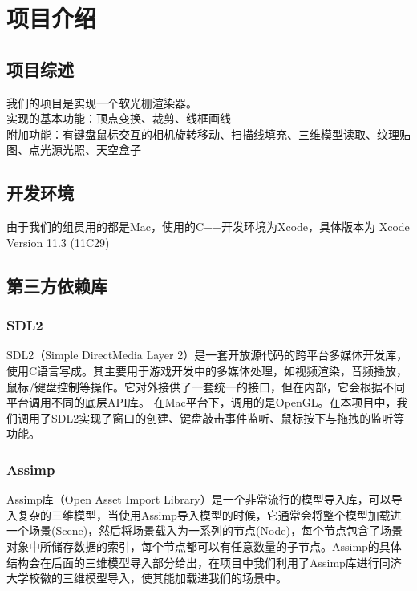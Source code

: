 

    \chapter{项目介绍}

    \section{项目综述}
        \begin{spacing}{2.5}
\noindent 我们的项目是实现一个软光栅渲染器。\\实现的基本功能：顶点变换、裁剪、线框画线\\
	附加功能：有键盘鼠标交互的相机旋转移动、扫描线填充、三维模型读取、纹理贴图、点光源光照、天空盒子     	
        \end{spacing}



    \section{开发环境}
	        \begin{spacing}{2.5}
由于我们的组员用的都是Mac，使用的C++开发环境为Xcode，具体版本为 Xcode Version 11.3 (11C29)
	        \end{spacing}



    \section{第三方依赖库}


    \subsection{SDL2}
\begin{spacing}{2.5}
   SDL2（Simple DirectMedia Layer 2）是一套开放源代码的跨平台多媒体开发库，使用C语言写成。其主要用于游戏开发中的多媒体处理，如视频渲染，音频播放，鼠标/键盘控制等操作。它对外接供了一套统一的接口，但在内部，它会根据不同平台调用不同的底层API库。
   在Mac平台下，调用的是OpenGL。在本项目中，我们调用了SDL2实现了窗口的创建、键盘敲击事件监听、鼠标按下与拖拽的监听等功能。
\end{spacing}



    \subsection{Assimp}
        \begin{spacing}{2.5}
        	Assimp库（Open Asset Import Library）是一个非常流行的模型导入库，可以导入复杂的三维模型，当使用Assimp导入模型的时候，它通常会将整个模型加载进一个场景(Scene)，然后将场景载入为一系列的节点(Node)，每个节点包含了场景对象中所储存数据的索引，每个节点都可以有任意数量的子节点。Assimp的具体结构会在后面的三维模型导入部分给出，在项目中我们利用了Assimp库进行同济大学校徽的三维模型导入，使其能加载进我们的场景中。
        \end{spacing}

